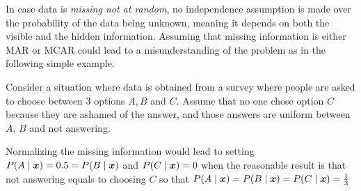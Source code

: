 In case data is \emph{missing not at random}, no independence assumption is made over the probability of the data being unknown, meaning it depends on both the visible and the hidden information. Assuming that missing information is either MAR or MCAR could lead to a misunderstanding of the problem as in the following simple example.

\begin{exampleth}
  Consider a situation where data is obtained from a survey where people are asked to choose between 3 options \(A, B\) and \(C\). Assume that no one chose option \(C\) because they are ashamed of the answer, and those answers are uniform between \(A\), \(B\) and not answering.

  Normalizing the missing information would lead to setting \(P(A \mid \bm{x}) = 0.5 = P(B \mid \bm{x})\) and \(P(C \mid \bm{x}) = 0\) when the reasonable result is that not answering equals to choosing \(C\) so that \(P(A \mid \bm{x}) = P(B \mid \bm{x}) = P(C \mid \bm{x}) = \frac{1}{3}\)
\end{exampleth}
